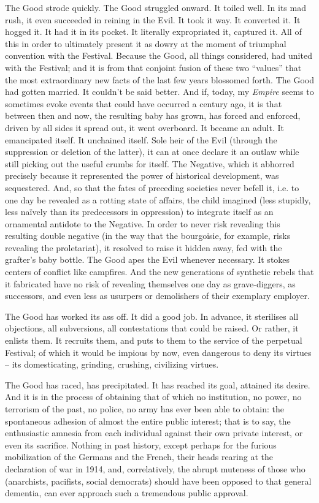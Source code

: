 The Good strode quickly. The Good struggled onward. It toiled well. In its mad rush, it even succeeded in reining in the Evil. It took it way. It converted it. It hogged it. It had it in its pocket. It literally expropriated it, captured it. All of this in order to ultimately present it as dowry at the moment of triumphal convention with the Festival. Because the Good, all things considered, had united with the Festival; and it is from that conjoint fusion of these two ``values'' that the most extraordinary new facts of the last few years blossomed forth. The Good had gotten married. It couldn't be said better. And if, today, my \textit{Empire} seems to sometimes evoke events that could have occurred a century ago, it is that between then and now, the resulting baby has grown, has forced and enforced, driven by all sides it spread out, it went overboard. It became an adult. It emancipated itself. It unchained itself. Sole heir of the Evil (through the suppression or deletion of the latter), it can at once declare it an outlaw while still picking out the useful crumbs for itself. The Negative, which it abhorred precisely because it represented the power of historical development, was sequestered. And, so that the fates of preceding societies never befell it, i.e. to one day be revealed as a rotting state of affairs, the child imagined (less stupidly, less na\"ively than its predecessors in oppression) to integrate itself as an ornamental antidote to the Negative. In order to never risk revealing this resulting double negative (in the way that the bourgoisie, for example, risks revealing the proletariat), it resolved to raise it hidden away, fed with the grafter's baby bottle. The Good apes the Evil whenever necessary. It stokes centers of conflict like campfires. And the new generations of synthetic rebels that it fabricated have no risk of revealing themselves one day as grave-diggers, as successors, and even less as usurpers or demolishers of their exemplary employer.

The Good has worked its ass off. It did a good job. In advance, it sterilises all objections, all subversions, all contestations that could be raised. Or rather, it enlists them. It recruits them, and puts to them to the service of the perpetual Festival; of which it would be impious by now, even dangerous to deny its virtues -- its domesticating, grinding, crushing, civilizing virtues.

The Good has raced, has precipitated. It has reached its goal, attained its desire. And it is in the process of obtaining that of which no institution, no power, no terrorism of the past, no police, no army has ever been able to obtain: the spontaneous adhesion of almost the entire public interest; that is to say, the enthusiastic amnesia from each individual against their own private interest, or even its sacrifice. Nothing in past history, except perhaps for the furious mobilization of the Germans and the French, their heads rearing at the declaration of war in 1914, and, correlatively, the abrupt muteness of those who (anarchists, pacifists, social democrats) should have been opposed to that general dementia, can ever approach such a tremendous public approval.

